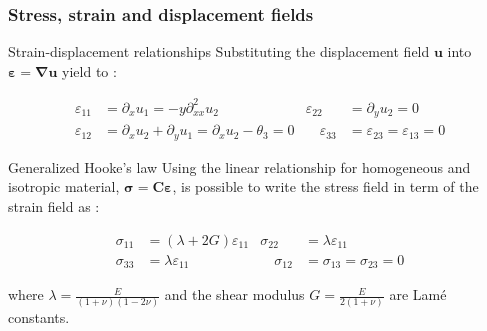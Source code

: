 \documentclass[aspectratio=169]{beamer}
\begin{document}
\begin{frame}
  \frametitle{Stress, strain and displacement fields}
  \begin{block}{Strain-displacement relationships}
    Substituting the displacement field $\mathbf u$ into $\boldsymbol{\varepsilon}=\boldsymbol\nabla\mathbf u$ yield to :
    \vspace{-0.6cm}

    \begin{align*}
      \varepsilon_{11} & =\partial_{x}u_{1}=-y\partial_{xx}^2u_{2}                           & \varepsilon_{22}       & =\partial_{y}u_{2}=0                      \\
      \varepsilon_{12} & =\partial_{x}u_{2}+\partial_{y}u_{1}=\partial_{x}u_{2}-\theta_{3}=0 & \quad \varepsilon_{33} & = \varepsilon_{23} = \varepsilon_{13} = 0
    \end{align*}
  \end{block}
  \begin{block}{Generalized Hooke's law}
    Using the linear relationship for homogeneous and isotropic material,
    $\boldsymbol\sigma=\mathbf C\boldsymbol\varepsilon$, is possible to write the stress field in term of the strain field as :
    \vspace{-0.6cm}

    \begin{align*}
      \sigma_{11}       & =(\lambda + 2G)\varepsilon_{11} &
      \sigma_{22}       & =\lambda \varepsilon_{11}         \\
      \sigma_{33}       & =\lambda \varepsilon_{11}       &
      \quad \sigma_{12} & = \sigma_{13} = \sigma_{23} = 0
    \end{align*}

    where $\lambda=\frac{E}{(1+\nu)(1-2\nu)}$ and the shear modulus $G=\frac{E}{2(1+\nu)}$ are Lamé constants.
  \end{block}
\end{frame}
\end{document}
